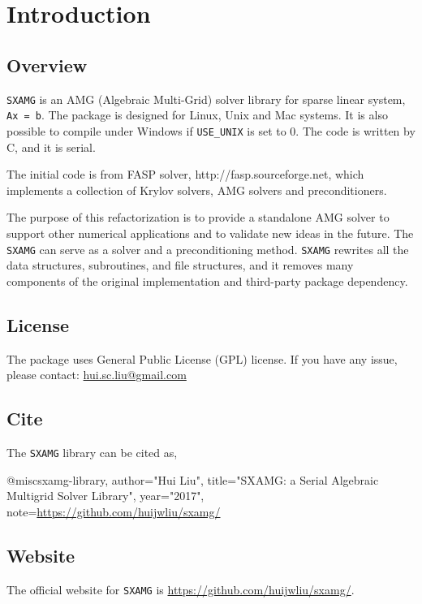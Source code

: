 
\chapter{Introduction}

\section{Overview}

\verb|SXAMG| is an AMG (Algebraic Multi-Grid) solver 
library for sparse linear system, \verb|Ax = b|. 
The package is designed for Linux, Unix and Mac systems. 
It is also possible to compile under Windows if \verb|USE_UNIX| is set to 0. 
The code is written by C, and it is serial.

The initial code is from FASP solver, http://fasp.sourceforge.net, which implements a collection of Krylov solvers, AMG solvers and preconditioners.

The purpose of this refactorization is to provide a standalone AMG solver to support other numerical applications and to validate new ideas in the future. The \verb|SXAMG| can serve as a solver and a preconditioning method.
\verb|SXAMG| rewrites all the data structures, subroutines, and file structures, and it removes many components of the original implementation and third-party package dependency.

\section{License}

The package uses General Public License (GPL) license. 
If you have any issue, please contact: \href{mailto: hui.sc.liu@gmail.com}{hui.sc.liu@gmail.com}

\section{Cite}
The \verb|SXAMG| library can be cited as,
\begin{evb}
@misc{sxamg-library,
    author="Hui Liu",
    title="SXAMG: a Serial Algebraic Multigrid Solver Library",
    year="2017",
    note={\url{https://github.com/huijwliu/sxamg/}}
}
\end{evb}


\section{Website}
The official website for \verb|SXAMG| is \url{https://github.com/huijwliu/sxamg/}.

